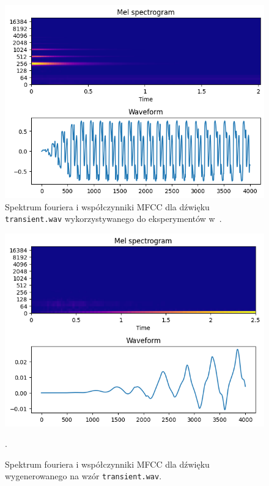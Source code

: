 \begin{multicols}{3}
\begin{figure}[H]
    \centering
    \includegraphics[width=0.9\linewidth]{rys06/transient_sample_literature.png}
    \caption{
      Spektrum fouriera i współczynniki MFCC dla dźwięku \texttt{transient.wav} wykorzystywanego
      do eksperymentów w~\cite{evolutionary_puredata_results}.
    }\label{fig:literature_transient_sound_overview}
\end{figure}

\begin{figure}[H]
    \centering
    \includegraphics[width=0.9\linewidth]{rys06/evolved_sample_transient.png}
    \caption{
      Spektrum fouriera i współczynniki MFCC dla dźwięku wygenerowanego na wzór
      \texttt{transient.wav}.
    }\label{fig:evolved_transient_sound_overview}.
\end{figure}


\end{multicols}
